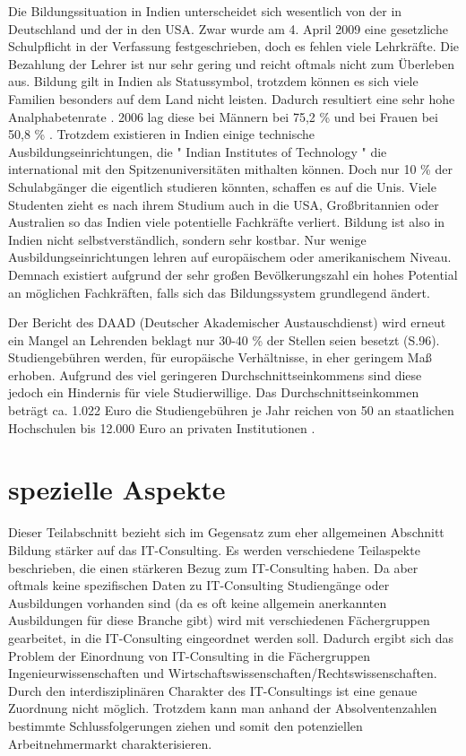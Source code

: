 Die Bildungssituation in Indien unterscheidet sich wesentlich von der in Deutschland und der in den USA. Zwar wurde am 4. April 2009 eine gesetzliche Schulpflicht in der Verfassung festgeschrieben, doch es fehlen viele Lehrkräfte. \cite{dw} Die Bezahlung der Lehrer ist nur sehr gering und reicht oftmals nicht zum Überleben aus. Bildung gilt in Indien als Statussymbol, trotzdem können es sich viele Familien besonders auf dem Land nicht leisten. Dadurch resultiert eine sehr hohe Analphabetenrate \cite{analpha}. 2006 lag diese bei Männern bei 75,2 \% und bei Frauen bei 50,8 \% .
Trotzdem existieren in Indien einige technische Ausbildungseinrichtungen, die " Indian Institutes of Technology " die international mit den Spitzenuniversitäten mithalten können. Doch nur 10 \% der Schulabgänger die eigentlich studieren könnten, schaffen es auf die Unis. Viele Studenten zieht es nach ihrem Studium auch in die USA, Großbritannien oder Australien so das Indien viele potentielle Fachkräfte verliert.
Bildung ist also in Indien nicht selbstverständlich, sondern sehr kostbar. Nur wenige Ausbildungseinrichtungen lehren auf europäischem oder amerikanischem Niveau. Demnach existiert aufgrund der sehr großen Bevölkerungszahl ein hohes Potential an möglichen Fachkräften, falls sich das Bildungssystem grundlegend ändert.

Der Bericht des DAAD (Deutscher Akademischer Austauschdienst) \cite{daad} wird erneut ein Mangel an Lehrenden beklagt nur 30-40 \% der Stellen seien besetzt (S.96).
Studiengebühren werden, für europäische Verhältnisse, in eher geringem Maß erhoben. Aufgrund des viel geringeren Durchschnittseinkommens sind diese jedoch ein Hindernis für viele Studierwillige. Das Durchschnittseinkommen beträgt ca. 1.022 Euro \cite{ausa} die Studiengebühren je Jahr reichen von 50 an staatlichen Hochschulen bis 12.000 Euro an privaten Institutionen \cite[101]{daad}.


 \section{spezielle Aspekte}
Dieser Teilabschnitt bezieht sich im Gegensatz zum eher allgemeinen Abschnitt Bildung stärker auf das IT-Consulting. Es werden verschiedene Teilaspekte beschrieben, die einen stärkeren Bezug zum IT-Consulting haben. Da aber oftmals keine spezifischen Daten zu IT-Consulting Studiengänge oder Ausbildungen vorhanden sind (da es oft keine allgemein anerkannten Ausbildungen für diese Branche gibt) wird mit verschiedenen Fächergruppen gearbeitet, in die IT-Consulting eingeordnet werden soll. 
Dadurch ergibt sich das Problem der Einordnung von IT-Consulting in die Fächergruppen Ingenieurwissenschaften und Wirtschaftswissenschaften/Rechtswissenschaften. Durch den interdisziplinären Charakter des IT-Consultings ist eine genaue Zuordnung nicht möglich. Trotzdem kann man anhand der Absolventenzahlen bestimmte Schlussfolgerungen ziehen und somit den potenziellen Arbeitnehmermarkt charakterisieren.

